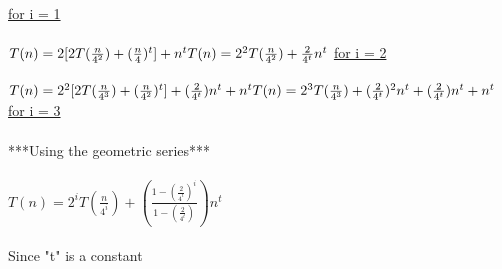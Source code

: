 \documentclass{article}
\begin{document}
	\underline{for i = 1}\\\\
\begin{math}
	T(n) = 2[2T(\frac{n}{4^{2}}) + (\frac{n}{4})^{t}] + n^{t}\\\\
	T(n) = 2^{2}T(\frac{n}{4^{2}}) + \frac{2}{4^{t}}n^{t}\end{math}
	\underline{for i = 2}\\\\
\begin{math}
	T(n) = 2^{2}[2T(\frac{n}{4^{3}}) + (\frac{n}{4^{2}}) ^ {t}]  + (\frac{2}{4^{t}})n^{t} + n^{t}\\\\
	T(n) = 2^{3}T(\frac{n}{4^{3}}) + (\frac{2}{4^{t}})^{2}n^{t} + (\frac{2}{4^{t}})n^{t} + n^{t}\end{math}
	\underline{for i = 3}\\\\
***Using the geometric series***\\\\
\begin{math}
	T(n) = 2^{i}T(\frac{n}{4^{i}}) + (\frac{1 - (\frac{2}{4^t})^{i}}{1 - (\frac{2}{4^{t}})})n^{t}
\end{math}\\\\
Since "t" is a constant
\end{document}
